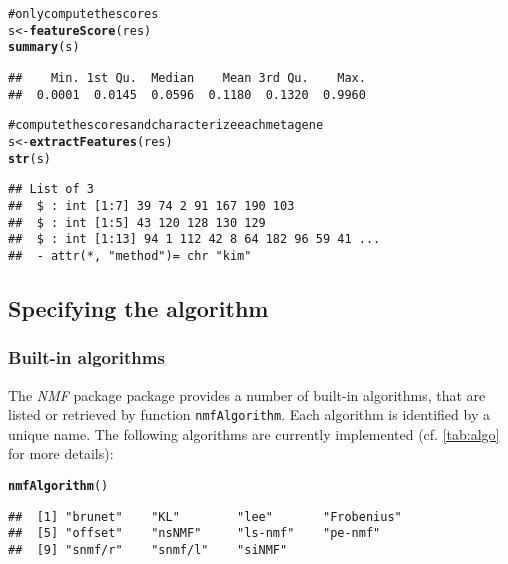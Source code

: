 \documentclass[a4paper]{article}\usepackage{graphicx, color}
\makeatletter
\newcommand{\hlfunctioncall}[1]{\textcolor[rgb]{0.501960784313725,0,0.329411764705882}{\textbf{#1}}}%
\newcommand{\hlcomment}[1]{\textcolor[rgb]{0.180392156862745,0.6,0.341176470588235}{#1}}%
\newenvironment{kframe}{%
 \def\at@end@of@kframe{}%
 \ifinner\ifhmode%
  \def\at@end@of@kframe{\end{minipage}}%
  \begin{minipage}{\columnwidth}%
 \fi\fi%
 \def\FrameCommand##1{\hskip\@totalleftmargin \hskip-\fboxsep
 \colorbox{shadecolor}{##1}\hskip-\fboxsep
     \hskip-\linewidth \hskip-\@totalleftmargin \hskip\columnwidth}%
 \MakeFramed {\advance\hsize-\width
   \@totalleftmargin\z@ \linewidth\hsize
   \@setminipage}}%
 {\par\unskip\endMakeFramed%
 \at@end@of@kframe}
\newenvironment{knitrout}{}{} %
\let\code=\texttt
\newcommand{\pkgname}[1]{\textit{#1}\xspace}
\newcommand{\Rpkg}[1]{\pkgname{#1} package\xspace}
\newcommand{\nmfpack}{\Rpkg{NMF}}
\makeatother
\begin{document}
\begin{knitrout}
\color{fgcolor}\begin{kframe}
\begin{alltt}
\hlcomment{# only compute the scores}
s <- \hlfunctioncall{featureScore}(res)
\hlfunctioncall{summary}(s)
\end{alltt}
\begin{verbatim}
##    Min. 1st Qu.  Median    Mean 3rd Qu.    Max. 
##  0.0001  0.0145  0.0596  0.1180  0.1320  0.9960
\end{verbatim}
\begin{alltt}

\hlcomment{# compute the scores and characterize each metagene}
s <- \hlfunctioncall{extractFeatures}(res)
\hlfunctioncall{str}(s)
\end{alltt}
\begin{verbatim}
## List of 3
##  $ : int [1:7] 39 74 2 91 167 190 103
##  $ : int [1:5] 43 120 128 130 129
##  $ : int [1:13] 94 1 112 42 8 64 182 96 59 41 ...
##  - attr(*, "method")= chr "kim"
\end{verbatim}
\end{kframe}
\end{knitrout}


\subsection{Specifying the algorithm}\label{sec:algo}

\subsubsection{Built-in algorithms}
The \nmfpack package provides a number of built-in algorithms, that are listed or retrieved by function \code{nmfAlgorithm}. 
Each algorithm is identified by a unique name.
The following algorithms are currently implemented (cf. \cref{tab:algo} for more details):

\begin{knitrout}
\color{fgcolor}\begin{kframe}
\begin{alltt}
\hlfunctioncall{nmfAlgorithm}()
\end{alltt}
\begin{verbatim}
##  [1] "brunet"    "KL"        "lee"       "Frobenius"
##  [5] "offset"    "nsNMF"     "ls-nmf"    "pe-nmf"   
##  [9] "snmf/r"    "snmf/l"    "siNMF"
\end{verbatim}
\end{kframe}
\end{knitrout}
\end{document}
